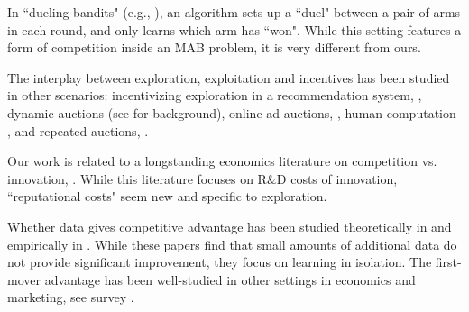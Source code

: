 \documentclass[../competing_bandits_with_appendix.tex]{subfiles}
\begin{document}
In ``dueling bandits" (e.g., \cite{Yue-dueling-icml09, Yue-dueling12}), an algorithm sets up a ``duel" between a pair of arms in each round, and only learns which arm has ``won". While this setting features a form of competition inside an MAB problem, it is very different from ours.


The interplay between exploration, exploitation and incentives has been studied in other scenarios: incentivizing exploration in a recommendation system,
    \eg \cite{Kremer-JPE14,Frazier-ec14,Che-13,ICexploration-ec15,Bimpikis-exploration-ms17},
dynamic auctions
    (see \cite{DynAuctions-survey10} for background),
online ad auctions, \eg
    \cite{MechMAB-ec09,DevanurK09,NSV08,Transform-ec10-jacm},
human computation
    \cite{RepeatedPA-ec14,Ghosh-itcs13,Krause-www13},
and repeated auctions, \eg
    \cite{Amin-auctions-nips13,Amin-auctions-nips14,Jieming-ec18}.


Our work is related to a longstanding economics literature on competition vs. innovation, \eg \cite{Schumpeter-42,barro2004economic,Aghion-QJE05}. While this literature focuses on R\&D costs of innovation, ``reputational costs" seem new and specific to exploration.


Whether data gives competitive advantage
has been studied theoretically in \cite{varian2018artificial,
  lambrecht2015can} and empirically in
\cite{bajari2018impact}.
While these papers find that small amounts
  of additional data do not provide significant improvement,
  they focus on learning in isolation.
The first-mover advantage has been well-studied in other settings in economics and marketing, see survey \cite{kerin1992first}.
\end{document}
